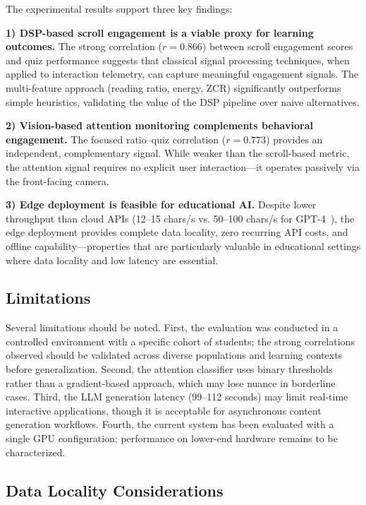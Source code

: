 \documentclass[conference]{IEEEtran}
\begin{document}
The experimental results support three key findings:

\textbf{1) DSP-based scroll engagement is a viable proxy for learning outcomes.} The strong correlation ($r = 0.866$) between scroll engagement scores and quiz performance suggests that classical signal processing techniques, when applied to interaction telemetry, can capture meaningful engagement signals. The multi-feature approach (reading ratio, energy, ZCR) significantly outperforms simple heuristics, validating the value of the DSP pipeline over naive alternatives.

\textbf{2) Vision-based attention monitoring complements behavioral engagement.} The focused ratio--quiz correlation ($r = 0.773$) provides an independent, complementary signal. While weaker than the scroll-based metric, the attention signal requires no explicit user interaction---it operates passively via the front-facing camera.

\textbf{3) Edge deployment is feasible for educational AI.} Despite lower throughput than cloud APIs (12--15 chars/s vs. 50--100 chars/s for GPT-4~\cite{openai2023gpt4}), the edge deployment provides complete data locality, zero recurring API costs, and offline capability---properties that are particularly valuable in educational settings where data locality and low latency are essential.

\subsection{Limitations}

Several limitations should be noted. First, the evaluation was conducted in a controlled environment with a specific cohort of students; the strong correlations observed should be validated across diverse populations and learning contexts before generalization. Second, the attention classifier uses binary thresholds rather than a gradient-based approach, which may lose nuance in borderline cases. Third, the LLM generation latency (99--112 seconds) may limit real-time interactive applications, though it is acceptable for asynchronous content generation workflows. Fourth, the current system has been evaluated with a single GPU configuration; performance on lower-end hardware remains to be characterized.

\subsection{Data Locality Considerations}
\end{document}
